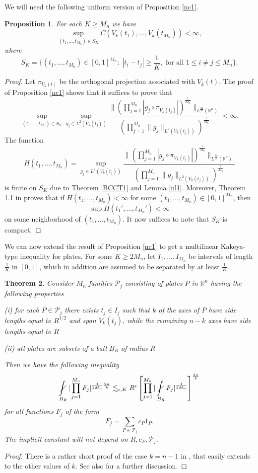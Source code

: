 \documentclass[amssymb,amsfonts,12pt]{amsart}
\newtheorem{theorem}{Theorem}[section]
\newtheorem{proposition}[theorem]{Proposition}
\def\R{{\mathbb R}}
\def\P{{\mathcal P}}\def\J{{\mathcal J}}
\begin{document}
\bigskip
We will need the following uniform version of Proposition \ref{nc1}.
\begin{proposition}
\label{np2}
For each $K\ge M_n$ we have
$$\sup_{(t_1,\ldots,t_{M_n})\in S_K}C(V_k(t_1),\ldots,V_k(t_{M_n}))<\infty,$$
where
$$S_K=\{(t_1,\ldots,t_{M_n})\in[0,1]^{M_n}:\;|t_i-t_j|\ge \frac1K,\text{ for all }1\le i\not=j\le M_n\}.$$
\end{proposition}
\begin{proof}
Let $\pi_{V_k(t)}$ be the orthogonal projection associated with $V_k(t)$.
The proof of Proposition \ref{nc1} shows that it  suffices to prove that
$$\sup_{(t_1,\ldots,t_{M_n})\in S_K}\sup_{g_j\in L^{2}({V_k(t_j)})}\frac{\|(\prod_{j=1}^{M_n}|g_j\circ \pi_{V_k(t_j)}|)^{\frac1{M_n}}\|_{L^{\frac{2n}{k}}(\R^n)}}{(\prod_{j=1}^{M_n}\|g_j\|_{L^{2}(V_k(t_j))})^{\frac1{M_n}}}<\infty.$$
The function
$$H(t_1,\ldots,t_{M_n})=\sup_{g_j\in L^{2}({V_k(t_j)})}\frac{\|(\prod_{j=1}^{M_n}|g_j\circ \pi_{V_k(t_j)}|)^{\frac1{M_n}}\|_{L^{\frac{2n}{k}}(\R^n)}}{(\prod_{j=1}^{M_n}\|g_j\|_{L^{2}(V_k(t_j))})^{\frac1{M_n}}}$$
is finite on $S_K$ due to Theorem \ref{BCCT1} and Lemma \ref{nl1}. Moreover, Theorem 1.1 in \cite{BBFL} proves that if $H(t_1,\ldots,t_{M_n})<\infty$ for some $(t_1,\ldots,t_{M_n})\in[0,1]^{M_n}$, then $$\sup H(t_1',\ldots,t_{M_n}')<\infty$$ on some neighborhood of $(t_1,\ldots,t_{M_n})$. It now suffices to note that $S_K$ is compact.

\end{proof}




We can now extend the result of Proposition \ref{nc1} to get a multilinear Kakeya-type inequality for plates. For some $K\ge 2M_n$, let $I_1,\ldots,I_{M_n}$ be intervals of length $\frac1K$ in $[0,1]$, which in addition are assumed to be separated by at least $\frac1K$.
\begin{theorem}
\label{nt3}
Consider $M_n$ families $\P_j$ consisting of plates $P$ in $\R^n$ having the following properties
\medskip

(i) for each $P\in\P_j$ there exists $t_j\in I_j$ such that $k$ of the axes of $P$ have side lengths equal to $R^{1/2}$ and span  $V_k(t_j)$, while the remaining $n-k$ axes have side lengths  equal to $R$
\medskip

(ii) all plates are subsets of a ball $B_R$ of radius $R$
\medskip

Then we have the following inequality
\begin{equation}
\label{ne3}
\nint_{B_R}|\prod_{j=1}^{M_n}F_j|^{\frac1{2M_n}\frac{2n}{k}}\lesssim_{\epsilon, K}R^{\epsilon} \left[\prod_{j=1}^{M_n}|\nint_{B_R}F_j|^{\frac1{2M_n}}\right]^{\frac{2n}k}
\end{equation}
for all functions  $F_j$ of the form
$$F_j=\sum_{P\in\P_j}c_P1_P.$$
The implicit constant will not depend on $R,c_P,\P_j$.
\end{theorem}
\begin{proof}
There is a rather short proof of the case $k=n-1$ in \cite{Gu}, that easily extends to the other values of $k$. See also \cite{BD6} for a further discussion.
\end{proof}
\end{document}
